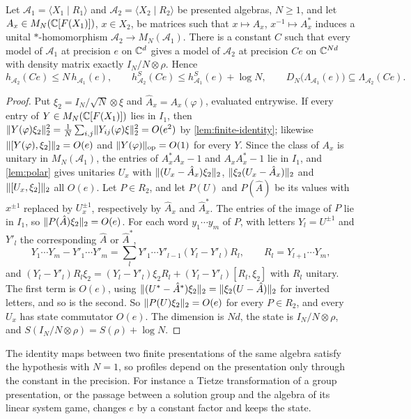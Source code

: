 \begin{proposition}\label{prop:algebraic-map}
Let $\mathcal A_1=\langle X_1\mid R_1\rangle$ and $\mathcal A_2=\langle X_2\mid R_2\rangle$ be presented algebras, $N\ge1$, and
let $A_x\in M_N(\mathbb C[F(X_1)])$, $x\in X_2$, be matrices such that $x\mapsto A_x$, $x^{-1}\mapsto A_x^*$ induces a unital
$*$-homomorphism $\mathcal A_2\to M_N(\mathcal A_1)$. There is a constant $C$ such that every model of $\mathcal A_1$ at precision
$e$ on $\mathbb C^d$ gives a model of $\mathcal A_2$ at precision $Ce$ on $\mathbb C^{Nd}$ with density matrix exactly $I_N/N\otimes\rho$.
Hence
\[
h_{\mathcal A_2}(Ce)\le N\,h_{\mathcal A_1}(e),\qquad h^S_{\mathcal A_2}(Ce)\le h^S_{\mathcal A_1}(e)+\log N,\qquad
D_N\bigl(\Lambda_{\mathcal A_1}(e)\bigr)\subseteq\Lambda_{\mathcal A_2}(Ce).
\]
\end{proposition}

\begin{proof}
Put $\xi_2=I_N/\sqrt N\otimes\xi$ and $\hat A_x=A_x(\varphi)$, evaluated entrywise. If every entry of $Y\in M_N(\mathbb C[F(X_1)])$
lies in $I_1$, then $\lVert Y(\varphi)\xi_2\rVert_2^2=\frac1N\sum_{i,j}\lVert Y_{ij}(\varphi)\xi\rVert_2^2=O(e^2)$ by \cref{lem:finite-identity};
likewise $\lVert [Y(\varphi),\xi_2]\rVert_2=O(e)$ and $\lVert Y(\varphi)\rVert_{\mathrm{op}}=O(1)$ for every $Y$. Since the class of $A_x$ is unitary in
$M_N(\mathcal A_1)$, the entries of $A_x^*A_x-1$ and $A_xA_x^*-1$ lie in $I_1$, and \cref{lem:polar} gives unitaries $U_x$ with
$\lVert (U_x-\hat A_x)\xi_2\rVert_2$, $\lVert \xi_2(U_x-\hat A_x)\rVert_2$ and $\lVert [U_x,\xi_2]\rVert_2$ all $O(e)$. Let $P\in R_2$, and let $P(U)$ and $P(\hat A)$
be its values with $x^{\pm1}$ replaced by $U_x^{\pm1}$, respectively by $\hat A_x$ and $\hat A_x^*$. The entries of the image
of $P$ lie in $I_1$, so $\lVert P(\hat A)\xi_2\rVert_2=O(e)$. For each word $y_1\cdots y_m$ of $P$, with letters $Y_l=U^{\pm1}$ and
$Y'_l$ the corresponding $\hat A$ or $\hat A^*$,
\[
Y_1\cdots Y_m-Y'_1\cdots Y'_m=\sum_lY'_1\cdots Y'_{l-1}(Y_l-Y'_l)R_l,\qquad R_l=Y_{l+1}\cdots Y_m ,
\]
and $(Y_l-Y'_l)R_l\xi_2=(Y_l-Y'_l)\xi_2R_l+(Y_l-Y'_l)[R_l,\xi_2]$ with $R_l$ unitary. The first term is $O(e)$, using
$\lVert (U^*-\hat A^*)\xi_2\rVert_2=\lVert \xi_2(U-\hat A)\rVert_2$ for inverted letters, and so is the second. So
$\lVert P(U)\xi_2\rVert_2=O(e)$ for every $P\in R_2$, and every $U_x$ has state commutator $O(e)$. The dimension is $Nd$, the state
is $I_N/N\otimes\rho$, and $S(I_N/N\otimes\rho)=S(\rho)+\log N$.
\end{proof}

The identity maps between two finite presentations of the same algebra satisfy the hypothesis with $N=1$, so profiles
depend on the presentation only through the constant in the precision. For instance a Tietze transformation of a group
presentation, or the passage between a solution group and the algebra of its linear system game, changes $e$ by a
constant factor and keeps the state.

